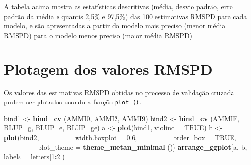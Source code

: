 \documentclass[
]{book}
\newenvironment{Shaded}{\begin{snugshade}}{\end{snugshade}}
\newcommand{\CommentTok}[1]{\textcolor[rgb]{0.56,0.35,0.01}{\textit{#1}}}
\newcommand{\DataTypeTok}[1]{\textcolor[rgb]{0.13,0.29,0.53}{#1}}
\newcommand{\DecValTok}[1]{\textcolor[rgb]{0.00,0.00,0.81}{#1}}
\newcommand{\FloatTok}[1]{\textcolor[rgb]{0.00,0.00,0.81}{#1}}
\newcommand{\KeywordTok}[1]{\textcolor[rgb]{0.13,0.29,0.53}{\textbf{#1}}}
\newcommand{\NormalTok}[1]{#1}
\newcommand{\OperatorTok}[1]{\textcolor[rgb]{0.81,0.36,0.00}{\textbf{#1}}}
\newcommand{\OtherTok}[1]{\textcolor[rgb]{0.56,0.35,0.01}{#1}}
\newcommand{\StringTok}[1]{\textcolor[rgb]{0.31,0.60,0.02}{#1}}
\begin{document}
\begin{Shaded}
\end{Shaded}

A tabela acima mostra as estatísticas descritivas (média, desvio padrão, erro padrão da média e quantis 2,5\% e 97,5\%) das 100 estimativas RMSPD para cada modelo, e são apresentadas a partir do modelo mais preciso (menor média RMSPD) para o modelo menos preciso (maior média RMSPD).

\hypertarget{plotagem-dos-valores-rmspd}{%
\section{Plotagem dos valores RMSPD}\label{plotagem-dos-valores-rmspd}}

Os valores das estimativas RMSPD obtidas no processo de validação cruzada podem ser plotados usando a função \texttt{plot\ ()}.

\begin{Shaded}
\begin{Highlighting}[]
\NormalTok{bind1 <-}\StringTok{ }\KeywordTok{bind_cv}\NormalTok{ (AMMI0, AMMI2, AMMI9)}
\NormalTok{bind2 <-}\StringTok{ }\KeywordTok{bind_cv}\NormalTok{ (AMMIF, BLUP_g, BLUP_e, BLUP_ge)}
\NormalTok{a <-}\StringTok{ }\KeywordTok{plot}\NormalTok{(bind1, }\DataTypeTok{violino =} \OtherTok{TRUE}\NormalTok{)}
\NormalTok{b <-}\StringTok{ }\KeywordTok{plot}\NormalTok{(bind2,}
          \DataTypeTok{width.boxplot =} \FloatTok{0.6}\NormalTok{,}
          \DataTypeTok{order_box =} \OtherTok{TRUE}\NormalTok{,}
          \DataTypeTok{plot_theme =} \KeywordTok{theme_metan_minimal}\NormalTok{ ())}
\KeywordTok{arrange_ggplot}\NormalTok{(a, b, }\DataTypeTok{labels =}\NormalTok{ letters[}\DecValTok{1}\OperatorTok{:}\DecValTok{2}\NormalTok{])}
\end{Highlighting}
\end{Shaded}
\end{document}
